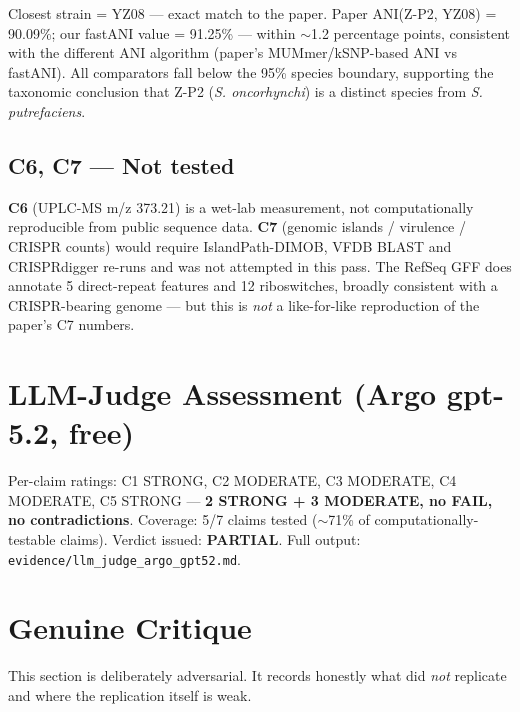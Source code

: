 \documentclass[11pt]{article}
\begin{document}
Closest strain = YZ08 --- exact match to the paper. Paper ANI(Z-P2, YZ08) = 90.09\%; our fastANI value = 91.25\% --- within $\sim$1.2 percentage points, consistent with the different ANI algorithm (paper's MUMmer/kSNP-based ANI vs fastANI). All comparators fall below the 95\% species boundary, supporting the taxonomic conclusion that Z-P2 (\emph{S. oncorhynchi}) is a distinct species from \emph{S. putrefaciens}.

\subsection{C6, C7 --- Not tested}
\textbf{C6} (UPLC-MS m/z 373.21) is a wet-lab measurement, not computationally reproducible from public sequence data. \textbf{C7} (genomic islands / virulence / CRISPR counts) would require IslandPath-DIMOB, VFDB BLAST and CRISPRdigger re-runs and was not attempted in this pass. The RefSeq GFF does annotate 5 direct-repeat features and 12 riboswitches, broadly consistent with a CRISPR-bearing genome --- but this is \emph{not} a like-for-like reproduction of the paper's C7 numbers.

\section{LLM-Judge Assessment (Argo gpt-5.2, free)}
Per-claim ratings: C1 STRONG, C2 MODERATE, C3 MODERATE, C4 MODERATE, C5 STRONG --- \textbf{2 STRONG + 3 MODERATE, no FAIL, no contradictions}. Coverage: 5/7 claims tested ($\sim$71\% of computationally-testable claims). Verdict issued: \textbf{PARTIAL}. Full output: \texttt{evidence/llm\_judge\_argo\_gpt52.md}.

\section{Genuine Critique}
This section is deliberately adversarial. It records honestly what did \emph{not} replicate and where the replication itself is weak.
\end{document}
